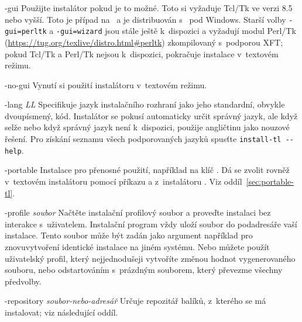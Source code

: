\documentclass[\classoptions,slovak,english,czech]{\classname}
\begin{document}
\begin{ttdescription}
\item[-gui] Použijte \GUI{} instalátor pokud je to možné. Toto si vyžaduje
Tcl/Tk ve verzi 8.5 nebo vyšší. Toto je případ na \MacOSX\ a je 
distribuován s~\TL{} pod Windows. Starší volby \texttt{-gui=perltk} 
a \texttt{-gui=wizard} jsou stále ještě k~dispozici a vyžadují modul Perl/Tk 
(\url{https://tug.org/texlive/distro.html#perltk}) zkompilovaný s~podporou
XFT; pokud Tcl/Tk a Perl/Tk nejsou k~dispozici, pokračuje instalace 
v~textovém režimu.   
\item[-no-gui] Vynutí si použití instalátoru v~textovém režimu.


\item[-lang {\sl LL}] Specifikuje jazyk instalačního rozhraní jako 
  jeho standardní, obvykle dvoupísmený, kód. Instalátor se pokusí 
  automaticky určit správný jazyk, ale když selže nebo když správný jazyk není
  k~dispozici, použije angličtinu jako nouzové řešení. 
  Pro získání seznamu všech podporovaných jazyků spusťte
  \verb|install-tl --help|.

\item[-portable] Instalace pro přenosné použití, například na klíč \USB{}.
  Dá se zvolit rovněž v~textovém instalátoru pomocí příkazu 
  a z~instalátoru \GUI{}. Viz oddíl~\ref{sec:portable-tl}.

\item[-profile {\sl soubor}] Načtěte instalační profilový 
  soubor a proveďte instalaci bez interakce s~uživatelem.
  Instalační program vždy uloží soubor
   do podadresáře  vaší instalace.  
  Tento soubor může být zadán jako argument například pro znovuvytvoření
  identické instalace na jiném systému. Nebo můžete  
  použít uživatelský profil, který nejjednodušeji 
  vytvoříte změnou hodnot vygenerovaného
  souboru, nebo odstartováním s~prázdným souborem, 
  který převezme všechny předvolby.

\item [-repository {\sl soubor-nebo-adresář}] Určuje 
  repozitář balíků, z~kterého se má instalovat; viz následující oddíl.


\end{ttdescription}
\end{document}
